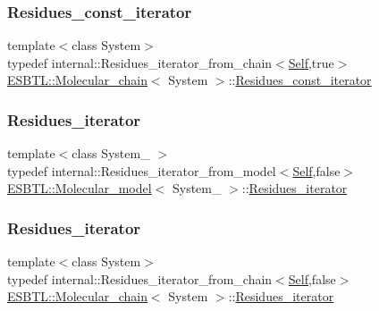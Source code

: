 \mbox{\label{group__grp__iters_ga4cadd9ac293bcd967a86f97bfc626a7f}} 
\subsubsection{\texorpdfstring{Residues\+\_\+const\+\_\+iterator}{Residues\_const\_iterator}\hspace{0.1cm}{\footnotesize\ttfamily [2/2]}}
{\footnotesize\ttfamily template$<$class System$>$ \\
typedef internal\+::\+Residues\+\_\+iterator\+\_\+from\+\_\+chain$<$\hyperlink{classESBTL_1_1Molecular__chain}{Self},true$>$ \hyperlink{classESBTL_1_1Molecular__chain}{E\+S\+B\+T\+L\+::\+Molecular\+\_\+chain}$<$ System $>$\+::\hyperlink{group__grp__iters_ga4cadd9ac293bcd967a86f97bfc626a7f}{Residues\+\_\+const\+\_\+iterator}}

\mbox{\label{group__grp__iters_gae3b7c7057b27581b14109723b28a3abd}} 
\subsubsection{\texorpdfstring{Residues\+\_\+iterator}{Residues\_iterator}\hspace{0.1cm}{\footnotesize\ttfamily [1/2]}}
{\footnotesize\ttfamily template$<$class System\+\_\+ $>$ \\
typedef internal\+::\+Residues\+\_\+iterator\+\_\+from\+\_\+model$<$\hyperlink{classESBTL_1_1Molecular__model}{Self},false$>$ \hyperlink{classESBTL_1_1Molecular__model}{E\+S\+B\+T\+L\+::\+Molecular\+\_\+model}$<$ System\+\_\+ $>$\+::\hyperlink{group__grp__iters_gae3b7c7057b27581b14109723b28a3abd}{Residues\+\_\+iterator}}

\mbox{\label{group__grp__iters_gaccad04117ad7c730e41bdb9aeab8f116}} 
\subsubsection{\texorpdfstring{Residues\+\_\+iterator}{Residues\_iterator}\hspace{0.1cm}{\footnotesize\ttfamily [2/2]}}
{\footnotesize\ttfamily template$<$class System$>$ \\
typedef internal\+::\+Residues\+\_\+iterator\+\_\+from\+\_\+chain$<$\hyperlink{classESBTL_1_1Molecular__chain}{Self},false$>$ \hyperlink{classESBTL_1_1Molecular__chain}{E\+S\+B\+T\+L\+::\+Molecular\+\_\+chain}$<$ System $>$\+::\hyperlink{group__grp__iters_gaccad04117ad7c730e41bdb9aeab8f116}{Residues\+\_\+iterator}}



